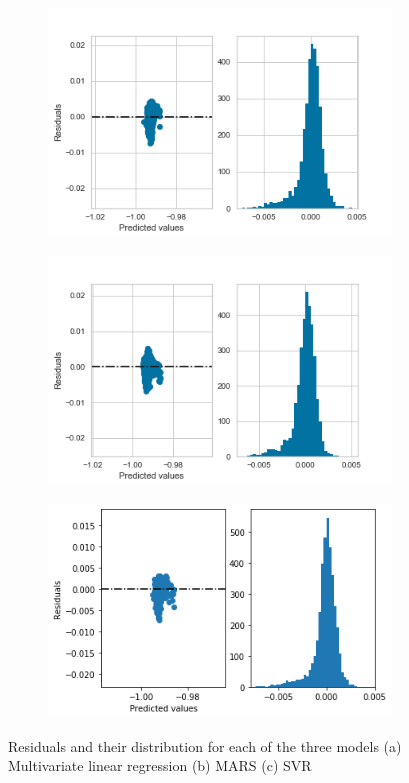 \documentclass[twoside]{article}
\begin{document}
\begin{figure}[htp]
\centering
    \begin{subfigure}{0.7\textwidth}
      \includegraphics[scale=0.65]{multireg_residuals}
      \caption{}
    \end{subfigure}%
    \par
    \begin{subfigure}{0.7\textwidth}
      \includegraphics[scale=0.65]{mars_residuals}
      \caption{}
    \end{subfigure}
    \par
    \begin{subfigure}{0.7\textwidth}
      \includegraphics[scale=0.65]{svr_residuals}
      \caption{}
    \end{subfigure}%
  \caption { Residuals and their distribution for each of the three models (a) Multivariate linear regression (b) MARS (c) SVR }\label{fig:residuals}
\end{figure}
\end{document}

